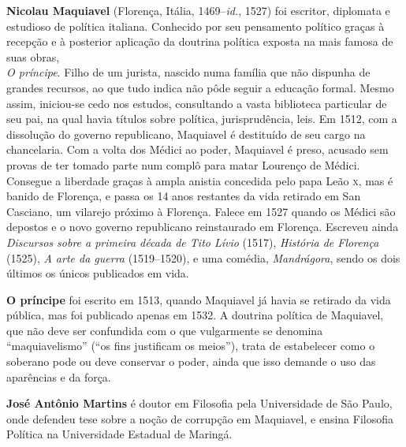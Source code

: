 \textbf{Nicolau Maquiavel} (Florença, Itália, 1469--\textit{id.}, 1527) foi escritor, diplomata e estudioso de política italiana. Conhecido por seu pensamento político graças à recepção e à posterior aplicação da doutrina política exposta na mais famosa de suas obras,\\ \textit{O príncipe}. Filho de um jurista, nascido numa família que não dispunha de grandes recursos, ao que tudo indica não pôde seguir a educação formal. Mesmo assim, iniciou-se cedo nos estudos, consultando a vasta biblioteca particular de seu pai, na qual havia títulos sobre política, jurisprudência, leis. Em 1512, com a dissolução do governo republicano, Maquiavel é destituído de seu cargo na chancelaria. Com a volta dos Médici ao poder, Maquiavel é preso, acusado sem provas de ter tomado parte num complô para matar Lourenço de Médici. Consegue a liberdade graças à ampla anistia concedida pelo papa Leão \textsc{x}, mas é banido de Florença, e passa os 14 anos restantes da vida retirado em San Casciano, um vilarejo próximo à Florença. Falece em 1527 quando os Médici são depostos e o novo governo republicano reinstaurado em Florença. Escreveu ainda \textit{Discursos sobre a primeira década de Tito Lívio} (1517), \textit{História de Florença} (1525), \textit{A arte da guerra} (1519--1520), e uma comédia, \textit{Mandrágora}, sendo os dois últimos os únicos publicados em vida. 

\textbf{O príncipe} foi escrito em 1513, quando Maquiavel já havia se retirado da vida pública, mas foi publicado apenas em 1532. A doutrina política de Maquiavel, que não deve ser confundida com o que vulgarmente se denomina “maquiavelismo” (“os fins justificam os meios”), trata de estabelecer como o soberano pode ou deve conservar o poder, ainda que isso demande o uso das aparências e da força. 

\textbf{José Antônio Martins} é doutor em Filosofia pela Universidade de São Paulo, onde defendeu tese sobre a noção de corrupção em Maquiavel, e ensina Filosofia Política na Universidade Estadual de Maringá.


